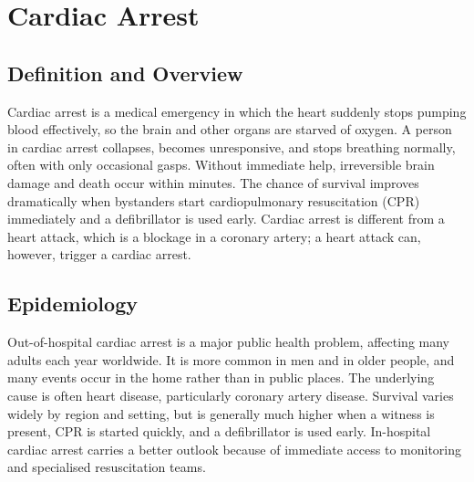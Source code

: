 \chapter{Cardiac Arrest}

\section*{Definition and Overview}
Cardiac arrest is a medical emergency in which the heart suddenly stops pumping blood effectively, so the brain and other organs are starved of oxygen. A person in cardiac arrest collapses, becomes unresponsive, and stops breathing normally, often with only occasional gasps. Without immediate help, irreversible brain damage and death occur within minutes. The chance of survival improves dramatically when bystanders start cardiopulmonary resuscitation (CPR) immediately and a defibrillator is used early. Cardiac arrest is different from a heart attack, which is a blockage in a coronary artery; a heart attack can, however, trigger a cardiac arrest.

\section*{Epidemiology}
Out-of-hospital cardiac arrest is a major public health problem, affecting many adults each year worldwide. It is more common in men and in older people, and many events occur in the home rather than in public places. The underlying cause is often heart disease, particularly coronary artery disease. Survival varies widely by region and setting, but is generally much higher when a witness is present, CPR is started quickly, and a defibrillator is used early. In-hospital cardiac arrest carries a better outlook because of immediate access to monitoring and specialised resuscitation teams.

